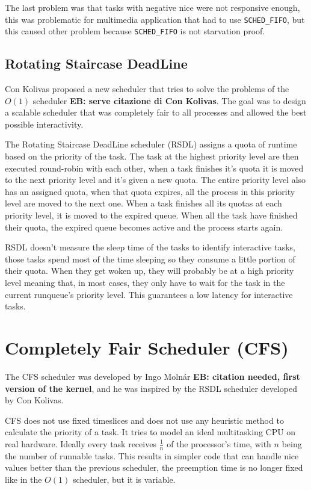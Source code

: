 \documentclass[10pt, oneside]{book}
\newcommand{\mycomment}[1]{\textbf{#1}}  %
\begin{document}
The last problem was that tasks with negative nice were not responsive enough, this was problematic for multimedia application that had to use \verb|SCHED_FIFO|, but this caused other problem because \verb|SCHED_FIFO| is not starvation proof.

\subsection{Rotating Staircase DeadLine}
Con Kolivas proposed a new scheduler that tries to solve the problems of the $O(1)$ scheduler \mycomment{EB: serve citazione di Con Kolivas}. The goal was to design a scalable scheduler that was completely fair to all processes and allowed the best possible interactivity.

The Rotating Staircase DeadLine scheduler (RSDL) assigns a quota of
runtime based on the priority of the task. The task at the highest
priority level are then executed round-robin with each other, when a
task finishes it's quota it is moved to the next priority level and
it's given a new quota. The entire priority level also has an assigned
quota, when that quota expires, all the process in this priority level
are moved to the next one. When a task finishes all its quotas at each
priority level, it is moved to the expired queue. When all the task
have finished their quota, the expired queue becomes active and the
process starts again.

RSDL doesn't measure the sleep time of the tasks to identify interactive tasks, those tasks spend most of the time sleeping so they consume a little portion of their quota. When they get woken up, they will probably be at a high priority level meaning that, in most cases, they only have to wait for the task in the current runqueue's priority level. This guarantees a low latency for interactive tasks. 

\section{Completely Fair Scheduler (CFS)}
The CFS scheduler was developed by Ingo Moln\'ar \mycomment{EB:
  citation needed, first version of the kernel}, and he was inspired
by the RSDL scheduler developed by Con Kolivas.

CFS does not use fixed timeslices and does not use any heuristic
method to calculate the priority of a task. It tries to model an ideal
multitasking CPU on real hardware. Ideally every task receives
$\frac 1n$ of the processor's time, with $n$ being the number of
runnable tasks. This results in simpler code that can handle nice
values better than the previous scheduler, the preemption time is no
longer fixed like in the $O(1)$ scheduler, but it is variable.
\end{document}
